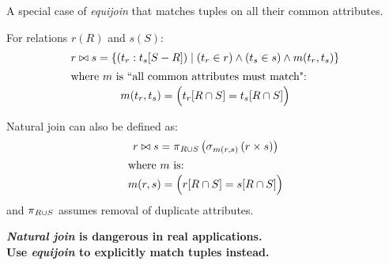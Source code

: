 \begin{multicols}{2}
\begin{CheatsheetEntryFrame}
    \end{CheatsheetEntryFrame}
    
    \begin{CheatsheetEntryFrame}


        A special case of \textit{equijoin} that matches tuples on all their common attributes.

        For relations $r(R)$ and $s(S)$:
        \begin{gather*}
            r \bowtie s = \setdef{\parens*{t_r : t_s[S - R]}}{(t_r \in r) \wedge (t_s \in s) \wedge m(t_r, t_s)} \\
            \intertext{where $m$ is ``all common attributes must match":}
            m(t_r, t_s) = \parens*{\vphantom{\frac{x}{x}} t_r[R \cap S] = t_s[R \cap S]} %
        \end{gather*}

        Natural join can also be defined as:
        \begin{gather*}
            r \bowtie s = \relproject_{R \cup S}{\parens*{\relselect_{m(r, s)}{\parens*{r \times s}}}} \\
            \intertext{where $m$ is:}
            m(r, s) = \parens*{\vphantom{\frac{x}{x}} r[R \cap S] = s[R \cap S]} %
        \end{gather*}
        and $\operatorname{\pi}_{R \cup S}$ assumes removal of duplicate attributes.

        \vspace{\TextExtraSkip}%
        \textbf{\color{mycontrastred}
            \textit{Natural join} is dangerous in real applications.\\[0mm]
            Use \textit{equijoin} to explicitly match tuples instead.
        }


\end{CheatsheetEntryFrame}
\end{multicols}
